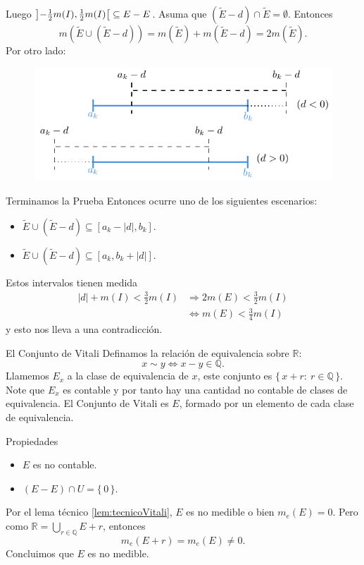 \documentclass[utf8]{beamer}
\theoremstyle{plain}
\theoremstyle{definition}
\theoremstyle{remark}
\numberwithin{equation}{section}
\newcommand{\bQ}{\mathbb{Q}}    %
\newcommand{\bR}{\mathbb{R}}    %
\newcommand{\bonj}[1]{\left\lbrack#1\right\rbrack}
\newcommand{\obonj}[1]{\left\rbrack#1\right\lbrack}
\newcommand{\set}[1]{\{\,#1\,\}}    %
\newcommand{\To}{\Rightarrow}
\newcommand{\half}{{\mathchoice{\nhalf}{\thalf}{\shalf}{\shalf}}} %
\newcommand{\nhalf}{\frac{1}{2}}
\newcommand{\shalf}{{\scriptstyle\frac{1}{2}}} %
\newcommand{\thalf}{{\tfrac{1}{2}}} %
\renewcommand{\.}{\Cdot}                %
\begin{document}
\begin{frame}
  Luego $\obonj{-\half m(I),\half m(I)}\subseteq E-E$. Asuma que $(\tilde{E}-d)\cap\tilde{E}=\emptyset$. Entonces
  $$m(\tilde{E}\cup(\tilde{E}-d))=m(\tilde{E})+m(\tilde{E}-d)=2m(\tilde{E}).$$
  Por otro lado:
  \begin{figure}
    \includegraphics{figs14/1/fig1.pdf}
  \end{figure}
\end{frame}

\begin{frame}{Terminamos la Prueba}
  Entonces ocurre uno de los siguientes escenarios:
  \begin{itemize}
    \item $\tilde{E}\cup(\tilde{E}-d)\subseteq\bonj{a_k-|d|,b_k}$.
    \item $\tilde{E}\cup(\tilde{E}-d)\subseteq\bonj{a_k,b_k+|d|}$.
  \end{itemize}
  Estos intervalos tienen medida 
  \begin{align*}
    |d|+m(I)<\frac32m(I)&\To 2m(E) <\frac32m(I)\\ 
    &\iff m(E)<\frac34m(I)
  \end{align*}
  y esto nos lleva a una contradicci\'on.
\end{frame}

\begin{frame}{El Conjunto de Vitali}
  Definamos la relaci\'on de equivalencia sobre $\bR$:
  $$x\sim y\iff x-y\in\bQ.$$
  Llamemos $E_x$ a la clase de equivalencia de $x$, este conjunto es $\set{x+r:\ r\in\bQ}$. Note que $E_x$ es contable y por tanto hay una cantidad no contable de clases de equivalencia. El \alert{Conjunto de Vitali} es $E$, formado por un elemento de cada clase de equivalencia.
\end{frame}

\begin{frame}{Propiedades}
  \begin{itemize}
    \item $E$ es no contable.
    \item $(E-E)\cap U=\set{0}$.
  \end{itemize}
  Por el lema t\'ecnico \ref{lem:tecnicoVitali}, $E$ es no medible o bien $m_e(E)=0$. Pero como $\bR=\bigcup_{r\in\bQ}E+r$, entonces 
  $$m_e(E+r)=m_e(E)\neq 0.$$
  Concluimos que $E$ es no medible.
\end{frame}
\end{document}
